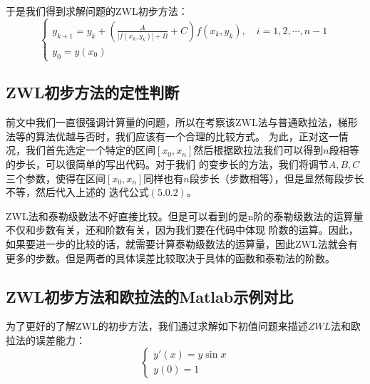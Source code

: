 \documentclass[a4paper,12pt]{article}
\begin{document}
于是我们得到求解问题的ZWL初步方法：
\begin{equation}
\left\{ \begin{array}{l}
{y_{k + 1}} = {y_k} + \left(\frac{A}{\left|f(x_k,y_k)\right|+B}+C\right)f({x_k},{y_k}),\quad i = 1,2, \cdots ,n - 1\\
{y_0} = y({x_0})
\end{array} \right.
\end{equation}



\subsection{ZWL初步方法的定性判断}
前文中我们一直很强调计算量的问题，所以在考察该ZWL法与普通欧拉法，梯形法等的算法优越与否时，我们应该有一个合理的比较方式。
为此，正对这一情况，我们首先选定一个特定的区间$[x_0,x_n]$然后根据欧拉法我们可以得到$n$段相等的步长，可以很简单的写出代码。对于我们
的变步长的方法，我们将调节$A,B,C$三个参数，使得在区间$[x_0,x_n]$同样也有$n$段步长（步数相等），但是显然每段步长不等，然后代入上述的
迭代公式$(5.0.2)$。\par
ZWL法和泰勒级数法不好直接比较。但是可以看到的是n阶的泰勒级数法的运算量不仅和步数有关，还和阶数有关，因为我们要在代码中体现
阶数的运算。因此，如果要进一步的比较的话，就需要计算泰勒级数法的运算量，因此ZWL法就会有
更多的步数。但是两者的具体误差比较取决于具体的函数和泰勒法的阶数。

\subsection{ZWL初步方法和欧拉法的Matlab示例对比}
为了更好的了解ZWL的初步方法，我们通过求解如下初值问题来描述$ZWL$法和欧拉法的误差能力：
\begin{equation}
    \left\{
      \begin{array}{ll}
        y'(x)=y\sin{x} \\
        y(0)=1
      \end{array}
    \right.
\end{equation}
\end{document}

